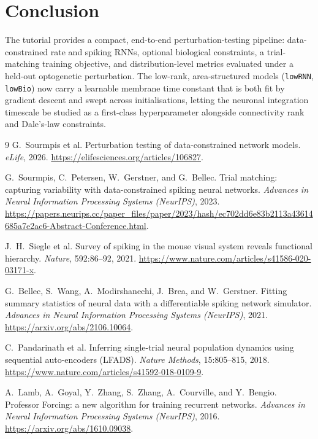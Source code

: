 \documentclass[11pt]{article}
\newcommand{\code}[1]{\texttt{#1}}
\begin{document}
\section{Conclusion}
The tutorial provides a compact, end-to-end perturbation-testing pipeline:
data-constrained rate and spiking RNNs, optional biological constraints, a
trial-matching training objective, and distribution-level metrics evaluated
under a held-out optogenetic perturbation. The low-rank, area-structured models
(\code{lowRNN}, \code{lowBio}) now carry a learnable membrane time constant that
is both fit by gradient descent and swept across initialisations, letting the
neuronal integration timescale be studied as a first-class hyperparameter
alongside connectivity rank and Dale's-law constraints.

\begin{thebibliography}{9}
G.\ Sourmpis et al.
\newblock Perturbation testing of data-constrained network models.
\newblock \emph{eLife}, 2026.
\newblock \url{https://elifesciences.org/articles/106827}.

G.\ Sourmpis, C.\ Petersen, W.\ Gerstner, and G.\ Bellec.
\newblock Trial matching: capturing variability with data-constrained spiking
neural networks.
\newblock \emph{Advances in Neural Information Processing Systems (NeurIPS)}, 2023.
\newblock \url{https://papers.neurips.cc/paper_files/paper/2023/hash/ec702dd6e83b2113a43614685a7e2ac6-Abstract-Conference.html}.

J.\ H.\ Siegle et al.
\newblock Survey of spiking in the mouse visual system reveals functional
hierarchy.
\newblock \emph{Nature}, 592:86--92, 2021.
\newblock \url{https://www.nature.com/articles/s41586-020-03171-x}.

G.\ Bellec, S.\ Wang, A.\ Modirshanechi, J.\ Brea, and W.\ Gerstner.
\newblock Fitting summary statistics of neural data with a differentiable spiking
network simulator.
\newblock \emph{Advances in Neural Information Processing Systems (NeurIPS)}, 2021.
\newblock \url{https://arxiv.org/abs/2106.10064}.

C.\ Pandarinath et al.
\newblock Inferring single-trial neural population dynamics using sequential
auto-encoders (LFADS).
\newblock \emph{Nature Methods}, 15:805--815, 2018.
\newblock \url{https://www.nature.com/articles/s41592-018-0109-9}.

A.\ Lamb, A.\ Goyal, Y.\ Zhang, S.\ Zhang, A.\ Courville, and Y.\ Bengio.
\newblock Professor Forcing: a new algorithm for training recurrent networks.
\newblock \emph{Advances in Neural Information Processing Systems (NeurIPS)}, 2016.
\newblock \url{https://arxiv.org/abs/1610.09038}.
\end{thebibliography}
\end{document}
